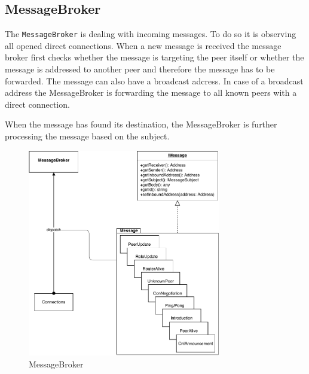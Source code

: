 \subsection{MessageBroker}\label{sec:mit-messageBroker}
The \lstinline|MessageBroker| is dealing with incoming messages. To do so it is observing all opened direct connections. When a new message is received the message broker first checks whether the message is targeting the peer itself or whether the message is addressed to another peer and therefore the message has to be forwarded. The message can also have a broadcast adcress. In case of a broadcast address the MessageBroker is forwarding the message to all known peers with a direct connection.

When the message has found its destination, the MessageBroker is further processing the message based on the subject. 

\begin{figure}
\centering
\includegraphics[width=0.75\textwidth]{graphics/implementation/mitosis-architecture-messages.pdf}
\caption{MessageBroker}
\label{fig:mit-messages}
\end{figure}


